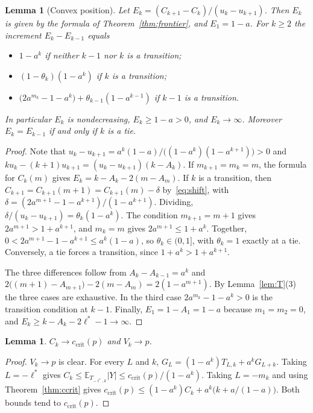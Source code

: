 \documentclass{article}
\newtheorem{lemma}[theorem]{Lemma}
\theoremstyle{definition}
\theoremstyle{remark}
\newcommand{\E}{\mathbb{E}}
\newcommand{\ccrit}{c_{\mathrm{crit}}}
\begin{document}
\begin{lemma}[Convex position]\label{lem:convexpos}
Let \(E_k=(C_{k+1}-C_k)/(u_k-u_{k+1})\). Then \(E_k\) is given by the formula of Theorem~\ref{thm:frontier}, and \(E_1=1-a\). For \(k\ge2\) the increment \(E_k-E_{k-1}\) equals
\begin{itemize}
\item \(1-a^k\) if neither \(k-1\) nor \(k\) is a transition;
\item \((1-\theta_k)(1-a^k)\) if \(k\) is a transition;
\item \(\bigl(2a^{m_k}-1-a^{k}\bigr)+\theta_{k-1}(1-a^{k-1})\) if \(k-1\) is a transition.
\end{itemize}
In particular \(E_k\) is nondecreasing, \(E_k\ge1-a>0\), and \(E_k\to\infty\). Moreover \(E_k=E_{k-1}\) if and only if \(k\) is a tie.
\end{lemma}
\begin{proof}
Note that \(u_k-u_{k+1}=a^k(1-a)/\bigl((1-a^k)(1-a^{k+1})\bigr)>0\) and \(k u_k-(k+1)u_{k+1}=(u_k-u_{k+1})(k-A_k)\). If \(m_{k+1}=m_k=m\), the formula for \(C_k(m)\) gives \(E_k=k-A_k-2(m-A_m)\). If \(k\) is a transition, then \(C_{k+1}=C_{k+1}(m+1)=C_{k+1}(m)-\delta\) by~\eqref{eq:shift}, with \(\delta=(2a^{m+1}-1-a^{k+1})/(1-a^{k+1})\). Dividing, \(\delta/(u_k-u_{k+1})=\theta_k(1-a^k)\). The condition \(m_{k+1}=m+1\) gives \(2a^{m+1}>1+a^{k+1}\), and \(m_k=m\) gives \(2a^{m+1}\le1+a^k\). Together, \(0<2a^{m+1}-1-a^{k+1}\le a^k(1-a)\), so \(\theta_k\in(0,1]\), with \(\theta_k=1\) exactly at a tie. Conversely, a tie forces a transition, since \(1+a^k>1+a^{k+1}\).

The three differences follow from \(A_k-A_{k-1}=a^k\) and \(2\bigl((m+1)-A_{m+1}\bigr)-2(m-A_m)=2(1-a^{m+1})\). By Lemma~\ref{lem:T}(3) the three cases are exhaustive. In the third case \(2a^{m_k}-1-a^k>0\) is the transition condition at \(k-1\). Finally, \(E_1=1-A_1=1-a\) because \(m_1=m_2=0\), and \(E_k\ge k-A_k-2\ell^*-1\to\infty\).
\end{proof}

\begin{lemma}\label{lem:limit}
\(C_k\to\ccrit(p)\) and \(V_k\to p\).
\end{lemma}
\begin{proof}
\(V_k\to p\) is clear. For every \(L\) and \(k\), \(G_L=(1-a^k)T_{L,k}+a^kG_{L+k}\). Taking \(L=-\ell^*\) gives \(C_k\le\E_{T_{-\ell^*,k}}|Y|\le\ccrit(p)/(1-a^k)\). Taking \(L=-m_k\) and using Theorem~\ref{thm:ccrit} gives \(\ccrit(p)\le(1-a^k)C_k+a^k\bigl(k+a/(1-a)\bigr)\). Both bounds tend to \(\ccrit(p)\).
\end{proof}
\end{document}
